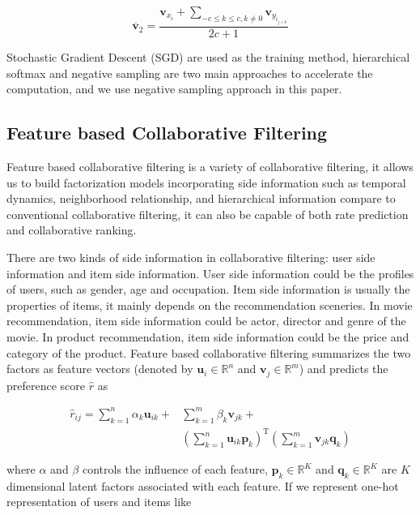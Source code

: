 \documentclass{sig-alternate-05-2015}
\begin{document}
\begin{equation}
	\overline{\mathbf{v}}_{2} = \frac{
    \mathbf{v}_{x_i} + 
    \sum_{-c \leq k \leq c, k \not= 0}{\mathbf{v}_{y_{i_{j+k}}}}
    }{2c+1}
\end{equation}

Stochastic Gradient Descent (SGD) are used as the training method,
hierarchical softmax and negative sampling are two main approaches to accelerate
the computation, and we use negative sampling approach in this paper.

\subsection{Feature based Collaborative Filtering}
Feature based collaborative filtering \cite{chen2011feature, chen2012svdfeature} is a variety of
collaborative filtering, it allows us to build factorization models incorporating
side information such as temporal dynamics, neighborhood relationship,
and hierarchical information compare to conventional collaborative filtering,
it can also be capable of both rate prediction and collaborative ranking.

There are two kinds of side information in collaborative filtering:
user side information and item side information.
User side information could be the profiles of users, such as
gender, age and occupation.
Item side information is usually the properties of items,
it mainly depends on the recommendation sceneries.
In movie recommendation, item side information could be actor, director and genre
of the movie. In product recommendation, item side information could be the price
and category of the product.
Feature based collaborative filtering summarizes the two factors as feature vectors
(denoted by $\mathbf{u}_i \in \mathbb{R}^{n}$ and $\mathbf{v}_j \in \mathbb{R}^{m}$) and predicts
the preference score $\hat{r}$ as

\begin{equation}
\begin{aligned}
\hat{r}_{ij} = \sum_{k=1}^{n} \alpha_k \mathbf{u}_{ik} + &\sum_{k=1}^{m} \beta_k \mathbf{v}_{jk} + \\
&\left( \sum_{k=1}^{n} \mathbf{u}_{ik} \mathbf{p}_k \right) ^ \mathrm{T}
\left( \sum_{k=1}^{m} \mathbf{v}_{jk} \mathbf{q}_k \right)
\end{aligned}
\end{equation}

where $\alpha$ and $\beta$ controls the influence of each feature,
$\mathbf{p}_{k} \in \mathbb{R}^K$ and $\mathbf{q}_{k} \in \mathbb{R}^K$
are $K$ dimensional latent factors associated with each feature.
If we represent one-hot representation of users and items like
\end{document}
